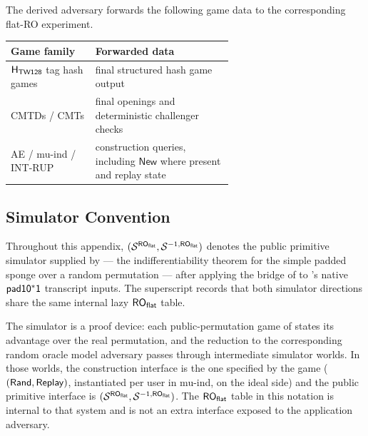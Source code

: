 The derived adversary forwards the following game data to the corresponding
flat-RO experiment.
\begin{center}
\small
\begin{tabular}{@{}l p{0.62\linewidth}@{}}
  \toprule
  Game family & Forwarded data \\
  \midrule
  $\mathsf{H}_{\mathsf{TW128}}$ tag hash games & final structured hash game output \\
  CMTDs / CMTs & final openings and deterministic challenger checks \\
  AE / mu-ind / \textsf{INT-RUP}
    & construction queries, including $\mathsf{New}$ where present and replay state \\
  \bottomrule
\end{tabular}
\end{center}

\subsection{Simulator Convention}
\label{app:simulator}

Throughout this appendix, $(\mathcal{S}^{\mathsf{RO}_{\mathsf{flat}}}, \mathcal{S}^{-1,\mathsf{RO}_{\mathsf{flat}}})$
denotes the public primitive simulator supplied by \cite[Theorem~2]{BDPV08}
--- the indifferentiability theorem for the simple
padded sponge over a random permutation --- after applying the
\cite[Theorem~3]{BDPV11} bridge of  to \TW{}'s native
$\mathsf{pad10^*1}$ transcript inputs. The superscript records that both
simulator directions share the same internal lazy $\mathsf{RO}_{\mathsf{flat}}$ table.

The simulator is a proof device: each public-permutation game of
 states its advantage
over the real permutation, and the reduction to the corresponding random oracle model
adversary passes through intermediate simulator worlds. In those worlds,
the construction interface is the one specified by the game
($(\mathsf{Rand},\mathsf{Replay})$, instantiated per user in mu-ind, on the ideal side)
and the public primitive interface is
$(\mathcal{S}^{\mathsf{RO}_{\mathsf{flat}}}, \mathcal{S}^{-1,\mathsf{RO}_{\mathsf{flat}}})$. The $\mathsf{RO}_{\mathsf{flat}}$ table in this
notation is internal to that system and is not an extra interface
exposed to the application adversary.

